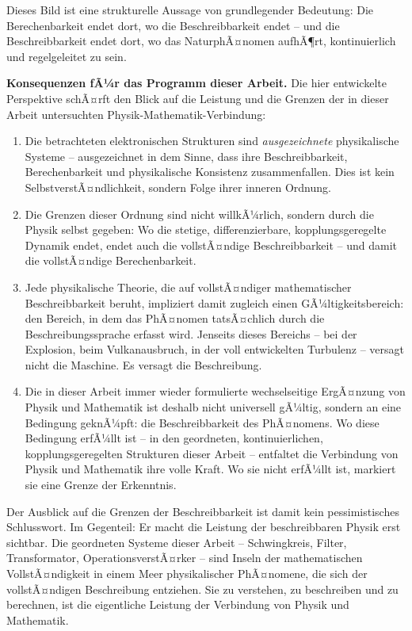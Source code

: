 ﻿\documentclass[12pt, a4paper]{article}
\begin{document}
	Dieses Bild ist eine strukturelle Aussage von grundlegender Bedeutung: Die Berechenbarkeit endet dort, wo die Beschreibbarkeit endet -- und die Beschreibbarkeit endet dort, wo das NaturphÃ¤nomen aufhÃ¶rt, kontinuierlich und regelgeleitet zu sein.

	\textbf{Konsequenzen fÃ¼r das Programm dieser Arbeit.}
	Die hier entwickelte Perspektive schÃ¤rft den Blick auf die Leistung und die Grenzen der in dieser Arbeit untersuchten Physik-Mathematik-Verbindung:

	\begin{enumerate}
		\item Die betrachteten elektronischen Strukturen sind \textit{ausgezeichnete} physikalische Systeme -- ausgezeichnet in dem Sinne, dass ihre Beschreibbarkeit, Berechenbarkeit und physikalische Konsistenz zusammenfallen. Dies ist kein SelbstverstÃ¤ndlichkeit, sondern Folge ihrer inneren Ordnung.
		\item Die Grenzen dieser Ordnung sind nicht willkÃ¼rlich, sondern durch die Physik selbst gegeben: Wo die stetige, differenzierbare, kopplungsgeregelte Dynamik endet, endet auch die vollstÃ¤ndige Beschreibbarkeit -- und damit die vollstÃ¤ndige Berechenbarkeit.
		\item Jede physikalische Theorie, die auf vollstÃ¤ndiger mathematischer Beschreibbarkeit beruht, impliziert damit zugleich einen GÃ¼ltigkeitsbereich: den Bereich, in dem das PhÃ¤nomen tatsÃ¤chlich durch die Beschreibungssprache erfasst wird. Jenseits dieses Bereichs -- bei der Explosion, beim Vulkanausbruch, in der voll entwickelten Turbulenz -- versagt nicht die Maschine. Es versagt die Beschreibung.
		\item Die in dieser Arbeit immer wieder formulierte wechselseitige ErgÃ¤nzung von Physik und Mathematik ist deshalb nicht universell gÃ¼ltig, sondern an eine Bedingung geknÃ¼pft: die Beschreibbarkeit des PhÃ¤nomens. Wo diese Bedingung erfÃ¼llt ist -- in den geordneten, kontinuierlichen, kopplungsgeregelten Strukturen dieser Arbeit -- entfaltet die Verbindung von Physik und Mathematik ihre volle Kraft. Wo sie nicht erfÃ¼llt ist, markiert sie eine Grenze der Erkenntnis.
	\end{enumerate}

	Der Ausblick auf die Grenzen der Beschreibbarkeit ist damit kein pessimistisches Schlusswort. Im Gegenteil: Er macht die Leistung der beschreibbaren Physik erst sichtbar. Die geordneten Systeme dieser Arbeit -- Schwingkreis, Filter, Transformator, OperationsverstÃ¤rker -- sind Inseln der mathematischen VollstÃ¤ndigkeit in einem Meer physikalischer PhÃ¤nomene, die sich der vollstÃ¤ndigen Beschreibung entziehen. Sie zu verstehen, zu beschreiben und zu berechnen, ist die eigentliche Leistung der Verbindung von Physik und Mathematik.
\end{document}
